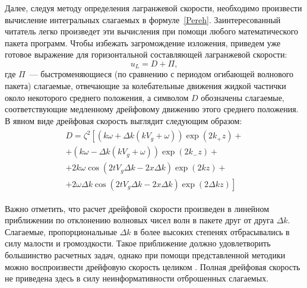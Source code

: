 Далее, следуя методу определения лагранжевой скорости, необходимо произвести вычисление интегральных слагаемых в формуле~\eqref{Pereh}. Заинтересованный читатель легко произведет эти вычисления при помощи любого математического пакета программ. Чтобы избежать загромождение изложения, приведем уже готовое выражение для горизонтальной составляющей лагранжевой скорости:
\begin{equation*}
u_{L}=D+\Pi,
\end{equation*}
где $ \Pi $~--- быстроменяющиеся (по сравнению с периодом огибающей волнового пакета) слагаемые, отвечающие  за колебательные движения жидкой частички около некоторого среднего положения, а символом $ D $  обозначены слагаемые, соответствующие медленному дрейфовому движению этого среднего положения. В явном виде дрейфовая скорость выглядит следующим образом:
\begin{gather}
\begin{gathered}
D=\zeta^{2} \left[ \left( k \omega +\Delta k \left( k V_{g}+\omega \right) \right) \exp \left( 2 k_{+}z \right) + \right.\\
+\left( k \omega - \Delta k \left( k V_{g}+\omega \right) \right) \exp \left( 2 k_{-}z \right)+\\
+2 k \omega \cos \left( 2 t V_{g} \Delta k - 2 x \Delta k \right) \exp \left( 2 k z \right) +\\
\left. +2 \omega \Delta k \cos \left( 2 t V_{g} \Delta k - 2 x \Delta k \right) \exp \left( 2 \Delta k z \right) \right]
\label{DriftPack}
\end{gathered}
\end{gather}
	  	
Важно отметить, что расчет дрейфовой скорости  произведен в линейном приближении по отклонению волновых чисел волн в пакете друг от друга  $ \Delta k $. Слагаемые, пропорциональные $ \Delta k $  в более высоких степенях отбрасывались в силу малости и громоздкости. Такое приближение должно удовлетворить большинство расчетных задач, однако при помощи представленной методики можно воспроизвести дрейфовую скорость целиком . Полная дрейфовая скорость не приведена здесь в силу неинформативности отброшенных слагаемых. 

